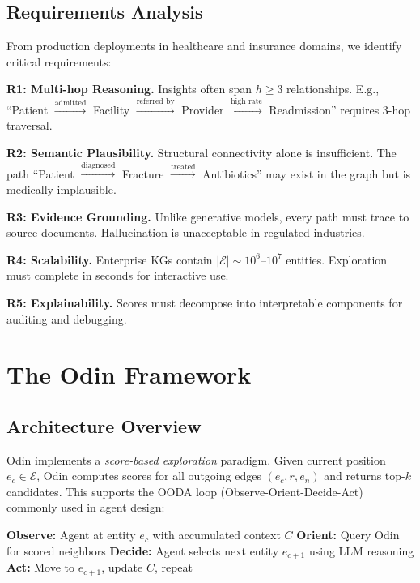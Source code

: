 \documentclass[10pt,twocolumn]{article}
\begin{document}
\subsection{Requirements Analysis}

From production deployments in healthcare and insurance domains, we identify critical requirements:

\textbf{R1: Multi-hop Reasoning.} Insights often span $h \geq 3$ relationships. E.g., ``Patient $\xrightarrow{\text{admitted}}$ Facility $\xrightarrow{\text{referred\_by}}$ Provider $\xrightarrow{\text{high\_rate}}$ Readmission'' requires 3-hop traversal.

\textbf{R2: Semantic Plausibility.} Structural connectivity alone is insufficient. The path ``Patient $\xrightarrow{\text{diagnosed}}$ Fracture $\xrightarrow{\text{treated}}$ Antibiotics'' may exist in the graph but is medically implausible.

\textbf{R3: Evidence Grounding.} Unlike generative models, every path must trace to source documents. Hallucination is unacceptable in regulated industries.

\textbf{R4: Scalability.} Enterprise KGs contain $|\mathcal{E}| \sim 10^6$--$10^7$ entities. Exploration must complete in seconds for interactive use.

\textbf{R5: Explainability.} Scores must decompose into interpretable components for auditing and debugging.

\section{The Odin Framework}

\subsection{Architecture Overview}

Odin implements a \textit{score-based exploration} paradigm. Given current position $e_c \in \mathcal{E}$, Odin computes scores for all outgoing edges $(e_c, r, e_n)$ and returns top-$k$ candidates. This supports the OODA loop (Observe-Orient-Decide-Act)~\cite{boyd1996essence} commonly used in agent design:

\begin{algorithmic}[1]
\STATE \textbf{Observe:} Agent at entity $e_c$ with accumulated context $C$
\STATE \textbf{Orient:} Query Odin for scored neighbors
\STATE \textbf{Decide:} Agent selects next entity $e_{c+1}$ using LLM reasoning
\STATE \textbf{Act:} Move to $e_{c+1}$, update $C$, repeat
\end{algorithmic}
\end{document}
